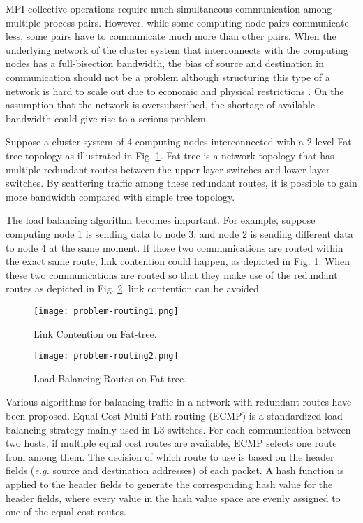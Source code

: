 MPI collective operations require much simultaneous communication among
multiple process pairs. However, while some computing node pairs
communicate less, some pairs have to communicate much more than other
pairs. When the underlying network of the cluster system that
interconnects with the computing nodes has a full-bisection bandwidth,
the bias of source and destination in communication should not be a
problem although structuring this type of a network is hard to scale out
due to economic and physical restrictions \cite{Al-Fares2008}. On the
assumption that the network is oversubscribed, the shortage of available
bandwidth could give rise to a serious problem.

Suppose a cluster system of 4 computing nodes interconnected with a
2-level Fat-tree topology as illustrated in Fig.
\ref{fig-problem-routing1}. Fat-tree is a network topology that has
multiple redundant routes between the upper layer switches and lower
layer switches. By scattering traffic among these redundant routes, it
is possible to gain more bandwidth compared with simple tree topology.

The load balancing algorithm becomes important. For example, suppose
computing node 1 is sending data to node 3, and node 2 is sending
different data to node 4 at the same moment. If those two communications
are routed within the exact same route, link contention could happen, as
depicted in Fig. \ref{fig-problem-routing1}. When these two
communications are routed so that they make use of the redundant routes
as depicted in Fig. \ref{fig-problem-routing2}, link contention can be
avoided.

\begin{figure}[htbp]
    \centering
    \texttt{[image: problem-routing1.png]}
    \caption{Link Contention on Fat-tree.}
    \label{fig-problem-routing1}
\end{figure}

\begin{figure}[htbp]
    \centering
    \texttt{[image: problem-routing2.png]}
    \caption{Load Balancing Routes on Fat-tree.}
    \label{fig-problem-routing2}
\end{figure}

Various algorithms for balancing traffic in a network with redundant
routes have been proposed. Equal-Cost Multi-Path routing (ECMP)
\cite{ecmp} is a standardized load balancing strategy mainly used in L3
switches. For each communication between two hosts, if multiple equal
cost routes are available, ECMP selects one route from among them. The
decision of which route to use is based on the header fields
(\emph{e.g.} source and destination addresses) of each packet. A hash
function is applied to the header fields to generate the corresponding
hash value for the header fields, where every value in the hash value
space are evenly assigned to one of the equal cost routes.

